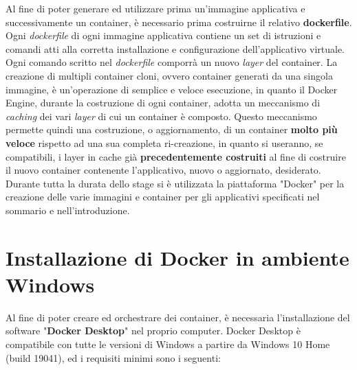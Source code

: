 Al fine di poter generare ed utilizzare prima un'immagine applicativa e successivamente un container, è necessario prima costruirne il relativo \textbf{\gls{dockerfile}}.
Ogni \textit{dockerfile} di ogni immagine applicativa contiene un set di istruzioni e comandi atti alla corretta installazione e configurazione dell'applicativo virtuale. Ogni comando scritto nel \textit{dockerfile} comporrà un nuovo \textit{layer} del container.
La creazione di multipli container cloni, ovvero container generati da una singola immagine, è un'operazione di semplice e veloce esecuzione, in quanto il Docker Engine, durante la costruzione di ogni container, adotta un meccanismo di \textit{\gls{caching}} dei vari \textit{\gls{layer}} di cui un container è composto. Questo meccanismo permette quindi una costruzione, o aggiornamento, di un container \textbf{molto più veloce} rispetto ad una sua completa ri-creazione, in quanto si useranno, se compatibili, i layer in cache già \textbf{precedentemente costruiti} al fine di costruire il nuovo container contenente l'applicativo, nuovo o aggiornato, desiderato.\\
Durante tutta la durata dello stage si è utilizzata la piattaforma "Docker" per la creazione delle varie immagini e container per gli applicativi specificati nel sommario e nell'introduzione.

\section{Installazione di Docker in ambiente Windows}
Al fine di poter creare ed orchestrare dei container, è necessaria l'installazione del software "\textbf{Docker Desktop}" nel proprio computer. Docker Desktop è compatibile con tutte le versioni di Windows a partire da Windows 10 Home (build 19041), ed i requisiti minimi sono i seguenti:

